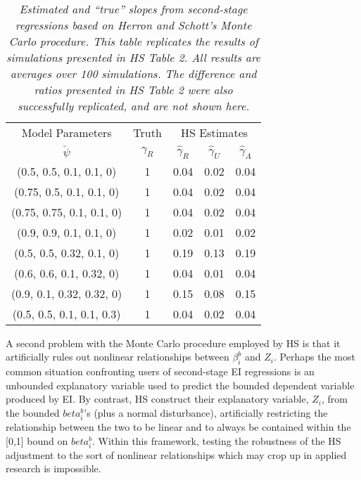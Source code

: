 \documentclass[11pt,titlepage]{article}
\begin{document}
\begin{table}[tb]
\label{t:hsrep}
\begin{center}
\begin{tabular}{cc|c c c}
Model Parameters & Truth & \multicolumn{3}{c}{HS Estimates} \\
$\breve\psi$  & $\gamma_R$ & $\hat\gamma_R$  &       $\hat\gamma_U$ & $\hat\gamma_A$ \\\hline
(0.5, 0.5, 0.1, 0.1, 0)&1 &       0.04    &       0.02    &       0.04        \\
(0.75, 0.5, 0.1, 0.1, 0) &1       &       0.04    &       0.02    &       0.04        \\
(0.75, 0.75, 0.1, 0.1, 0) &1      &       0.04    &       0.02    &       0.04     \\
(0.9, 0.9, 0.1, 0.1, 0) &1&       0.02    &       0.01    &       0.02          \\
(0.5, 0.5, 0.32, 0.1, 0) &1       &       0.19    &       0.13    &       0.19        \\
(0.6, 0.6, 0.1, 0.32, 0) &1       &       0.04    &       0.01    &       0.04     \\
(0.9, 0.1, 0.32, 0.32, 0)&1       &       0.15    &       0.08    &       0.15        \\
(0.5, 0.5, 0.1, 0.1, 0.3)&1       &       0.04    &       0.02    &       0.04     \\
\hline
\end{tabular}
\end{center}
\caption{\em Estimated and ``true'' slopes from 
second-stage regressions based on Herron and Schott's Monte Carlo 
procedure. This table replicates the results of simulations presented in
HS Table 2.  All results are averages over 100 simulations.  
The difference and ratios presented in HS Table 2 were also 
successfully replicated, and are not shown here.}
\end{table}

A second problem with the Monte Carlo procedure employed by HS is that
it artificially rules out nonlinear relationships between $\beta_i^b$
and $Z_i$.  Perhaps the most common situation confronting users of
second-stage EI regressions is an unbounded explanatory variable used
to predict the bounded dependent variable produced by EI.  By
contrast, HS construct their explanatory variable, $Z_i$, from the
bounded $beta_i^b$'s (plus a normal disturbance), artificially
restricting the relationship between the two to be linear and to
always be contained within the [0,1] bound on $beta_i^b$.  Within this
framework, testing the robustness of the HS adjustment to the sort of
nonlinear relationships which may crop up in applied research is
impossible.
\end{document}
